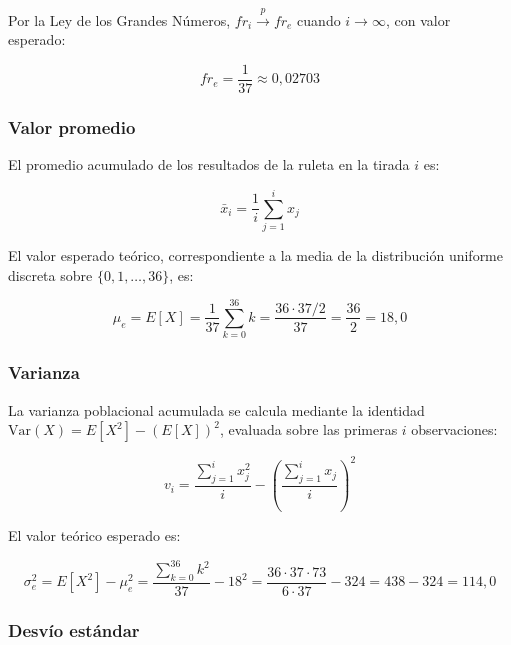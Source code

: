 \documentclass[a4paper, 11pt]{article}
\begin{document}
Por la Ley de los Grandes Números, $fr_i \xrightarrow{p} fr_e$ cuando
$i \to \infty$, con valor esperado:

\begin{equation}
  fr_e = \frac{1}{37} \approx 0{,}02703
  \label{eq:freq_esperada}
\end{equation}

\subsubsection*{Valor promedio}

El promedio acumulado de los resultados de la ruleta en la tirada $i$ es:

\begin{equation}
  \bar{x}_i = \frac{1}{i} \sum_{j=1}^{i} x_j
  \label{eq:promedio}
\end{equation}

El valor esperado teórico, correspondiente a la media de la distribución
uniforme discreta sobre $\{0, 1, \ldots, 36\}$, es:

\begin{equation}
  \mu_e = E[X] = \frac{1}{37} \sum_{k=0}^{36} k
    = \frac{36 \cdot 37 / 2}{37} = \frac{36}{2} = 18{,}0
  \label{eq:promedio_esperado}
\end{equation}

\subsubsection*{Varianza}

La varianza poblacional acumulada se calcula mediante la identidad
$\text{Var}(X) = E[X^2] - (E[X])^2$, evaluada sobre las primeras $i$
observaciones:

\begin{equation}
  v_{i} = \frac{\sum_{j=1}^{i} x_j^2}{i} - \left(\frac{\sum_{j=1}^{i} x_j}{i}\right)^2
  \label{eq:varianza}
\end{equation}

El valor teórico esperado es:

\begin{equation}
  \sigma^2_e = E[X^2] - \mu_e^2
    = \frac{\sum_{k=0}^{36} k^2}{37} - 18^2
    = \frac{36 \cdot 37 \cdot 73}{6 \cdot 37} - 324
    = 438 - 324 = 114{,}0
  \label{eq:varianza_esperada}
\end{equation}

\subsubsection*{Desvío estándar}
\end{document}
